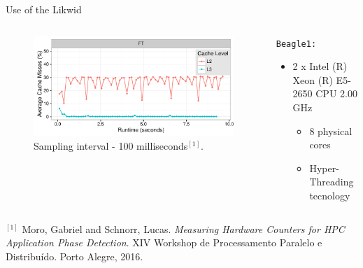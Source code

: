 \documentclass[12pt,xcolor=dvipsnames,presentation]{beamer}
\begin{document}
\begin{frame}[fragile,label={sec:org3d3b3e2}]{Use of the Likwid}
 \begin{columns}\begin{column}{.45\linewidth}
\begin{figure}[!htb]
\includegraphics[width=\linewidth]{../../producao/2016_wsppd/img/ft_L2_L3_100ms.pdf}
\caption{Sampling interval - 100 milliseconds$^{[1]}$.}
\label{figFT}
\end{figure}

\end{column}
\begin{column}{.35\linewidth}
{\small
\texttt{Beagle1:}
\begin{itemize}
\item 2 x Intel (R) Xeon (R) E5-2650 CPU 2.00 GHz
\begin{itemize}
\item 8 physical cores
\item Hyper-Threading tecnology
\end{itemize}
\end{itemize}
}
\end{column}
\end{columns}

\vspace{2cm}
\hline
\vspace{0.2cm}
\tiny \(^{[1]}\) \alert{Moro, Gabriel and Schnorr, Lucas}. \emph{Measuring Hardware Counters for
HPC Application Phase Detection}. XIV Workshop de Processamento
Paralelo e Distribuído. Porto Alegre, 2016.
\end{frame}
\end{document}
